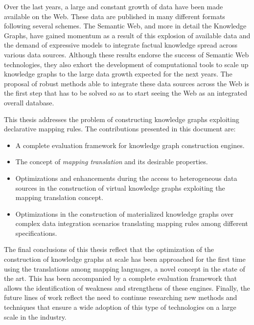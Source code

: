


\begin{abstractslong}    
Over the last years, a large and constant growth of data have been made available on the Web. These data are published in many different formats following several schemes. The Semantic Web, and more in detail the Knowledge Graphs, have gained momentum as a result of this explosion of available data and the demand of expressive models to integrate factual knowledge spread across various data sources. Although these results endorse the success of Semantic Web technologies, they also exhort the development of computational tools to scale up knowledge graphs to the large data growth expected for the next years. The proposal of robust methods able to integrate these data sources across the Web is the first step that has to be solved so as to start seeing the Web as an integrated overall database.

This thesis addresses the problem of constructing knowledge graphs exploiting declarative mapping rules. The contributions presented in this document are:
\begin{itemize}
     \item A complete evaluation framework for knowledge graph construction engines.
     \item The concept of \textit{mapping translation} and its desirable properties.
     \item Optimizations and enhancements during the access to heterogeneous data sources in the construction of virtual knowledge graphs exploiting the mapping translation concept.
     \item Optimizations in the construction of materialized knowledge graphs over complex data integration scenarios translating mapping rules among different specifications.
\end{itemize}

The final conclusions of this thesis reflect that the optimization of the construction of knowledge graphs at scale has been approached for the first time using the translations among mapping languages, a novel concept in the state of the art. This has been accompanied by a complete evaluation framework that allows the identification of weakness and strengthens of these engines. Finally, the future lines of work reflect the need to continue researching new methods and techniques that ensure a wide adoption of this type of technologies on a large scale in the industry.
\end{abstractslong}

